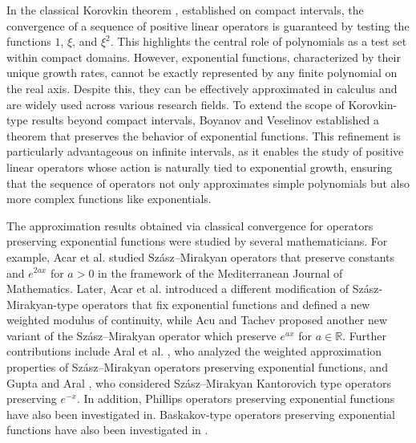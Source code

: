 \documentclass{amsart}
\providecommand{\U}[1]{\protect \rule{.1in}{.1in}}
\theoremstyle{plain}
\numberwithin{equation}{section}
\begin{document}
In the classical Korovkin theorem \cite{altomare, korovkin}, established on compact intervals, the convergence of a sequence of positive linear operators is guaranteed by testing the functions $1$, $\xi$, and $\xi^{2}$. This highlights the central role of polynomials as a test set within compact domains. However, exponential functions, characterized by their unique growth rates, cannot be exactly represented by any finite polynomial on the real axis. Despite this, they can be effectively approximated in calculus and are widely used across various research fields. To extend the scope of Korovkin-type results beyond compact intervals, Boyanov and Veselinov \cite{boyanov-veselinov} established a theorem that preserves the behavior of exponential functions. This refinement is particularly advantageous on infinite intervals, as it enables the study of positive linear operators whose action is naturally tied to exponential growth, ensuring that the sequence of operators not only approximates simple polynomials but also more complex functions like exponentials.


The approximation results obtained via classical convergence for operators preserving exponential functions were studied by several mathematicians. For example, Acar et al. \cite{acar-aral-gonska} studied Szász–Mirakyan operators that preserve constants and $e^{2ax}$ for $a>0$ in the framework of the Mediterranean Journal of Mathematics. Later, Acar et al. \cite{acar-aral-} introduced a different modification of Szász-Mirakyan-type operators that fix exponential functions and defined a new weighted modulus of continuity, while Acu and Tachev \cite{acu-tachev} proposed another new variant of the Szász–Mirakyan operator which preserve $e^{ax}$ for $a\in%
\mathbb{R}
.$ Further contributions include Aral et al. \cite{aral-inoan-rasa}, who analyzed the weighted approximation properties of Szász–Mirakyan operators preserving exponential functions, and Gupta and Aral \cite{gupta-aral}, who considered Szász–Mirakyan Kantorovich type operators preserving $e^{-x}$. In addition, Phillips operators preserving exponential functions have also been investigated in\cite {gupta-tachev}. Baskakov-type operators preserving exponential functions have also been investigated in \cite{ozsarac-acar, ovgu-ali, gupta-acu }.
\end{document}
